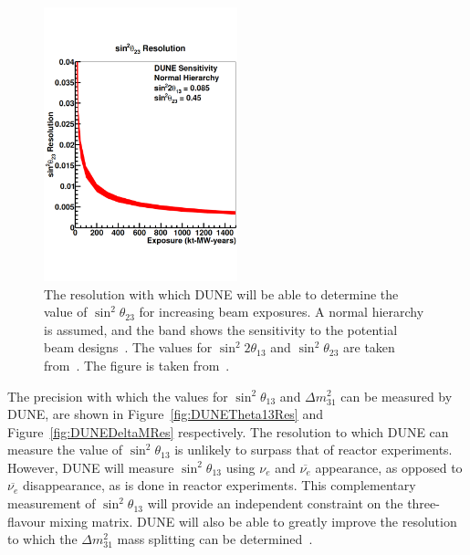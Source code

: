 \begin{figure}
  \centering
  \includegraphics[width=0.5\textwidth]{DUNETheta23Res}
  \caption[The resolution with which DUNE will be able to determine the value of $\sin^{2}\theta_{23}$ for increasing beam exposures]
          {The resolution with which DUNE will be able to determine the value of $\sin^{2}\theta_{23}$ for increasing beam exposures. A normal hierarchy is assumed, and the band shows the sensitivity to the potential beam designs~\citep{DUNECDR_V3}. The values for $\sin^{2}2\theta_{13}$ and $\sin^{2}\theta_{23}$ are taken from~\citep{NuFit2014}. The figure is taken from~\citep{DUNECDR_V2}.}
  \label{fig:DUNETheta23Res}
\end{figure}

The precision with which the values for $\sin^{2}\theta_{13}$ and $\Delta m^{2}_{31}$ can be measured by DUNE, are shown in Figure~\ref{fig:DUNETheta13Res} and Figure~\ref{fig:DUNEDeltaMRes} respectively. The resolution to which DUNE can measure the value of $\sin^{2}\theta_{13}$ is unlikely to surpass that of reactor experiments. However, DUNE will measure $\sin^{2}\theta_{13}$ using $\nu_e$ and $\overline{\nu_e}$ appearance, as opposed to $\overline{\nu_e}$ disappearance, as is done in reactor experiments. This complementary measurement of $\sin^{2}\theta_{13}$ will provide an independent constraint on the three-flavour mixing matrix. DUNE will also be able to greatly improve the resolution to which the $\Delta m^{2}_{31}$ mass splitting can be determined~\citep{DUNECDR_V2}. \\

